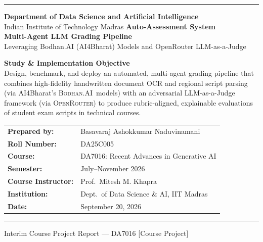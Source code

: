 \documentclass[11pt,a4paper]{article}
\newcommand{\BodhanAI}{\textsc{Bodhan.AI}}
\newcommand{\OpenRouter}{\textsc{OpenRouter}}
\begin{document}
\begin{titlepage}
    \thispagestyle{empty}
    \begin{flushleft}
        \textcolor{IITMAccent}{\rule{0.18\textwidth}{3pt}}
    \end{flushleft}
    \vspace{0.8cm}
    {\Large \textcolor{IITMBlue}{\textbf{Department of Data Science and Artificial Intelligence}}} \\[0.25cm]
    {\normalsize \textcolor{MutedText}{Indian Institute of Technology Madras}}
    \vfill
    {\Huge \color{IITMBlue} \textbf{Auto-Assessment System}} \\[0.35cm]
    {\LARGE \textbf{Multi-Agent LLM Grading Pipeline}} \\[0.15cm]
    {\large \textcolor{MutedText}{Leveraging Bodhan.AI (AI4Bharat) Models and OpenRouter LLM-as-a-Judge}}
    \vspace{1.0cm}

    \begin{keyfinding}
        \textbf{Study \& Implementation Objective} \vspace{2mm} \\
        Design, benchmark, and deploy an automated, multi-agent grading pipeline that combines high-fidelity handwritten document OCR and regional script parsing (via AI4Bharat's \BodhanAI\ models) with an adversarial LLM-as-a-Judge framework (via \OpenRouter) to produce rubric-aligned, explainable evaluations of student exam scripts in technical courses.
    \end{keyfinding}
    \vfill

    \begin{tabular}{@{}ll@{}}
        \textbf{Prepared by:} & Basavaraj Ashokkumar Naduvinamani \\[5pt]
        \textbf{Roll Number:} & DA25C005 \\[5pt]
        \textbf{Course:} & DA7016: Recent Advances in Generative AI \\[5pt]
        \textbf{Semester:} & July--November 2026 \\[5pt]
        \textbf{Course Instructor:} & Prof.\ Mitesh M. Khapra \\[5pt]
        \textbf{Institution:} & Dept.\ of Data Science \& AI, IIT Madras \\[5pt]
        \textbf{Date:} & September 20, 2026
    \end{tabular}
    \vspace{1.0cm}
    \begin{flushleft}
        \textcolor{IITMAccent}{\rule{\textwidth}{1pt}}
    \end{flushleft}
    {\small \textcolor{MutedText}{Interim Course Project Report --- DA7016 [Course Project]}}
\end{titlepage}
\end{document}
